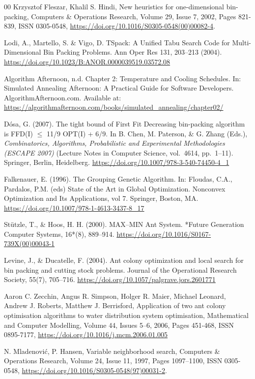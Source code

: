 \documentclass[12pt]{article}
\begin{document}
\begin{thebibliography}{00}
 Krzysztof Fleszar, Khalil S. Hindi, New heuristics for one-dimensional bin-packing, Computers \& Operations Research, Volume 29, Issue 7, 2002, Pages 821-839, ISSN 0305-0548, \url{https://doi.org/10.1016/S0305-0548(00)00082-4}.

 Lodi, A., Martello, S. \& Vigo, D. TSpack: A Unified Tabu Search Code for Multi-Dimensional Bin Packing Problems. Ann Oper Res 131, 203–213 (2004). \url{https://doi.org/10.1023/B:ANOR.0000039519.03572.08}

 Algorithm Afternoon, n.d. Chapter 2: Temperature and Cooling Schedules. In: Simulated Annealing Afternoon: A Practical Guide for Software Developers. AlgorithmAfternoon.com. Available at: \url{https://algorithmafternoon.com/books/simulated\_annealing/chapter02/}

 D\'osa, G. (2007). The tight bound of First Fit Decreasing bin-packing algorithm is FFD(I) $\leq$ 11/9 OPT(I) + 6/9. In B. Chen, M. Paterson, \& G. Zhang (Eds.), \textit{Combinatorics, Algorithms, Probabilistic and Experimental Methodologies (ESCAPE 2007)} (Lecture Notes in Computer Science, vol.~4614, pp.~1--11). Springer, Berlin, Heidelberg. \url{https://doi.org/10.1007/978-3-540-74450-4\_1}

 Falkenauer, E. (1996). The Grouping Genetic Algorithm. In: Floudas, C.A., Pardalos, P.M. (eds) State of the Art in Global Optimization. Nonconvex Optimization and Its Applications, vol 7. Springer, Boston, MA. \url{https://doi.org/10.1007/978-1-4613-3437-8_17}

 Stützle, T., \& Hoos, H. H. (2000). MAX–MIN Ant System. *Future Generation Computer Systems, 16*(8), 889--914. \url{https://doi.org/10.1016/S0167-739X(00)00043-1}

 Levine, J., \& Ducatelle, F. (2004). Ant colony optimization and local search for bin packing and cutting stock problems. Journal of the Operational Research Society, 55(7), 705–716. \url{https://doi.org/10.1057/palgrave.jors.2601771} 

 Aaron C. Zecchin, Angus R. Simpson, Holger R. Maier, Michael Leonard, Andrew J. Roberts, Matthew J. Berrisford, Application of two ant colony optimisation algorithms to water distribution system optimisation, Mathematical and Computer Modelling, Volume 44, Issues 5–6, 2006, Pages 451-468, ISSN 0895-7177, \url{https://doi.org/10.1016/j.mcm.2006.01.005} 

 N. Mladenovi{\'c}, P. Hansen, Variable neighborhood search, Computers \& Operations Research, Volume 24, Issue 11, 1997, Pages 1097--1100, ISSN 0305-0548, \url{https://doi.org/10.1016/S0305-0548(97)00031-2}.


\end{thebibliography}
\end{document}
